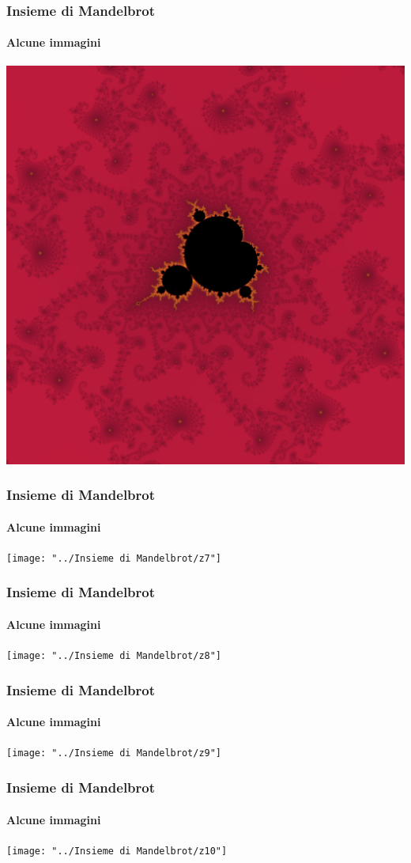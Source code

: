 \documentclass{beamer}
\begin{document}
			\begin{frame}
				\frametitle{Insieme di Mandelbrot}
				\framesubtitle{Alcune immagini}
				\begin{center}
					\includegraphics[width=0.7\linewidth]{"../Insieme di Mandelbrot/z5"}
				\end{center}
			\end{frame}
			\begin{frame}
				\frametitle{Insieme di Mandelbrot}
				\framesubtitle{Alcune immagini}
				\begin{center}
					\texttt{[image: "../Insieme di Mandelbrot/z7"]}
				\end{center}
			\end{frame}
			\begin{frame}
				\frametitle{Insieme di Mandelbrot}
				\framesubtitle{Alcune immagini}
				\begin{center}
					\texttt{[image: "../Insieme di Mandelbrot/z8"]}
				\end{center}
			\end{frame}
			\begin{frame}
				\frametitle{Insieme di Mandelbrot}
				\framesubtitle{Alcune immagini}
				\begin{center}
					\texttt{[image: "../Insieme di Mandelbrot/z9"]}
				\end{center}
			\end{frame}
			\begin{frame}
				\frametitle{Insieme di Mandelbrot}
				\framesubtitle{Alcune immagini}
				\begin{center}
					\texttt{[image: "../Insieme di Mandelbrot/z10"]}
				\end{center}
			\end{frame}
\end{document}
